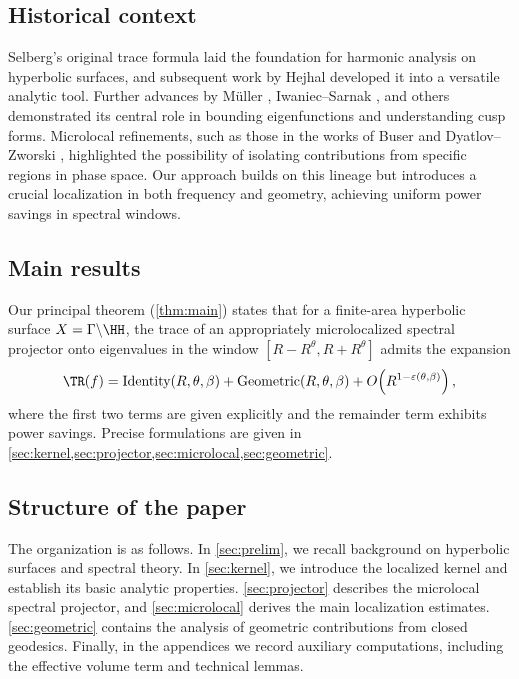 \subsection*{Historical context}
Selberg’s original trace formula \cite{selberg1956} laid the foundation for harmonic analysis on hyperbolic surfaces, 
and subsequent work by Hejhal \cite{hejhal1976, hejhal1983} developed it into a versatile analytic tool. 
Further advances by Müller \cite{mueller1983}, Iwaniec–Sarnak \cite{iwaniec1995}, and others demonstrated 
its central role in bounding eigenfunctions and understanding cusp forms. 
Microlocal refinements, such as those in the works of Buser \cite{buser1992} and 
Dyatlov–Zworski \cite{dyatlovzworski2019}, highlighted the possibility of isolating contributions 
from specific regions in phase space. 
Our approach builds on this lineage but introduces a crucial localization in both frequency and geometry, 
achieving uniform power savings in spectral windows.

\subsection*{Main results}
Our principal theorem (\cref{thm:main}) states that for a finite-area hyperbolic surface 
$X = \Gamma \backslash \HH$, the trace of an appropriately microlocalized spectral projector 
onto eigenvalues in the window $[R-R^\theta, R+R^\theta]$ admits the expansion
\[
  \TR(f) = \text{Identity}(R,\theta,\beta) + \text{Geometric}(R,\theta,\beta) 
  + O\!\left(R^{1-\varepsilon(\theta,\beta)}\right),
\]
where the first two terms are given explicitly and the remainder term exhibits power savings. 
Precise formulations are given in \cref{sec:kernel,sec:projector,sec:microlocal,sec:geometric}. 

\subsection*{Structure of the paper}
The organization is as follows. 
In \cref{sec:prelim}, we recall background on hyperbolic surfaces and spectral theory. 
In \cref{sec:kernel}, we introduce the localized kernel and establish its basic analytic properties. 
\cref{sec:projector} describes the microlocal spectral projector, and \cref{sec:microlocal} 
derives the main localization estimates. 
\cref{sec:geometric} contains the analysis of geometric contributions from closed geodesics. 
Finally, in the appendices we record auxiliary computations, including the effective volume term and technical lemmas.

